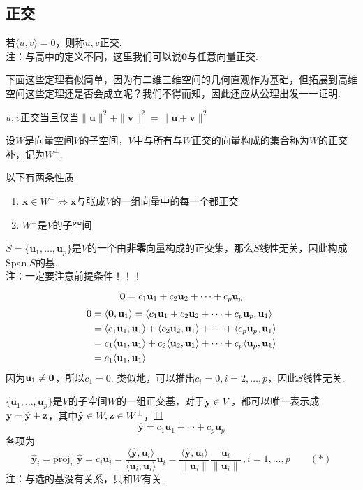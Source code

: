 \subsection{正交}
\begin{definition}[正交]
若$\langle u,v\rangle=0$，则称$u,v$正交.\\
注：与高中的定义不同，这里我们可以说$\mathbf{0}$与任意向量正交.
\end{definition}
下面这些定理看似简单，因为有二维三维空间的几何直观作为基础，但拓展到高维空间这些定理还是否会成立呢？我们不得而知，因此还应从公理出发一一证明.
\begin{theorem}
$u,v$正交当且仅当$\|\mathbf{u}\|^2+\|\mathbf{v}\|^2=\|\mathbf{u}+\mathbf{v}\|^2$
\end{theorem}
\begin{definition}
设$W$是向量空间$V$的子空间，$V$中与所有与$W$正交的向量构成的集合称为$W$的正交补，记为$W^\perp$.
\end{definition}
以下有两条性质
\begin{enumerate}
	\itemsep -3pt
	\item $\mathbf{x}\in W^\perp\iff\mathbf{x}$与张成$V$的一组向量中的每一个都正交
	\item $W^\perp$是$V$的子空间
\end{enumerate}
\begin{theorem}[正交必定线性无关]
\label{ortho_indep}
$S=\{\mathbf{u}_1,\dots,\mathbf{u}_p\}$是$V$的一个由\textbf{非零}向量构成的正交集，那么$S$线性无关，因此构成$\mathrm{Span}\;S$的基.\\
注：一定要注意前提条件！！！
\end{theorem}
\begin{analysis}
\[\mathbf{0}=c_1\mathbf{u}_1+c_2\mathbf{u}_2+\cdots+c_p\mathbf{u}_p\]
\[\begin{aligned}0&=\langle \mathbf{0},\mathbf{u}_1 \rangle=\langle c_1\mathbf{u}_1+c_2\mathbf{u}_2+\cdots+c_p\mathbf{u}_p,\mathbf{u}_1 \rangle\\
&=\langle c_1\mathbf{u}_1,\mathbf{u}_1 \rangle+\langle c_2\mathbf{u}_2,\mathbf{u}_1 \rangle+\cdots+\langle c_p\mathbf{u}_p,\mathbf{u}_1 \rangle\\
&=c_1\langle \mathbf{u}_1,\mathbf{u}_1 \rangle+c_2\langle \mathbf{u}_2,\mathbf{u}_1 \rangle+\cdots+c_p\langle \mathbf{u}_p,\mathbf{u}_1 \rangle\\
&=c_1\langle \mathbf{u}_1,\mathbf{u}_1 \rangle
\end{aligned}\]
因为$\mathbf{u}_1\ne\mathbf{0}$，所以$c_1=0$. 类似地，可以推出$c_i=0,i=2,\dots,p$，因此$S$线性无关.
\end{analysis}
\begin{theorem}[正交分解]
$\{\mathbf{u}_1,\dots,\mathbf{u}_p\}$是$V$的子空间$W$的一组正交基，对于$\mathbf{y}\in V$，都可以唯一表示成$\mathbf{y}=\hat{\mathbf{y}}+\mathbf{z}$，其中$\hat{\mathbf{y}}\in W,\mathbf{z}\in W^\perp$，且
\[\hat{\mathbf{y}}=c_1\mathbf{u}_1+\cdots+c_p\mathbf{u}_p\]
各项为
\[\hat{\mathbf{y}}_i=\mathrm{proj}_{u_i}\hat{\mathbf{y}}=c_i\mathbf{u}_i=\frac{\langle \hat{\mathbf{y}},\mathbf{u}_i\rangle}{\langle\mathbf{u}_i,\mathbf{u}_i\rangle}\mathbf{u}_i=\frac{\langle \hat{\mathbf{y}},\mathbf{u}_i\rangle}{\|\mathbf{u}_i\|}\frac{\mathbf{u}_i}{\|\mathbf{u}_i\|}\,,i=1,\dots,p\qquad(*)\]
注：与选的基没有关系，只和$W$有关.
\end{theorem}
